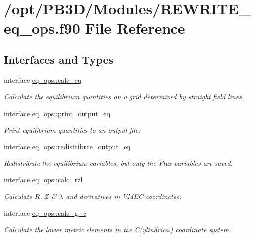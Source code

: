 \hypertarget{REWRITE__eq__ops_8f90}{}\section{/opt/\+P\+B3\+D/\+Modules/\+R\+E\+W\+R\+I\+T\+E\+\_\+eq\+\_\+ops.f90 File Reference}
\label{REWRITE__eq__ops_8f90}
\subsection*{Interfaces and Types}
\begin{DoxyCompactItemize}
\item 
interface \hyperlink{interfaceeq__ops_1_1calc__eq}{eq\+\_\+ops\+::calc\+\_\+eq}
\begin{DoxyCompactList}\small\item\em Calculate the equilibrium quantities on a grid determined by straight field lines. \end{DoxyCompactList}\item 
interface \hyperlink{interfaceeq__ops_1_1print__output__eq}{eq\+\_\+ops\+::print\+\_\+output\+\_\+eq}
\begin{DoxyCompactList}\small\item\em Print equilibrium quantities to an output file\+: \end{DoxyCompactList}\item 
interface \hyperlink{interfaceeq__ops_1_1redistribute__output__eq}{eq\+\_\+ops\+::redistribute\+\_\+output\+\_\+eq}
\begin{DoxyCompactList}\small\item\em Redistribute the equilibrium variables, but only the Flux variables are saved. \end{DoxyCompactList}\item 
interface \hyperlink{interfaceeq__ops_1_1calc__rzl}{eq\+\_\+ops\+::calc\+\_\+rzl}
\begin{DoxyCompactList}\small\item\em Calculate $R$, $Z$ \& $\lambda$ and derivatives in V\+M\+EC coordinates. \end{DoxyCompactList}\item 
interface \hyperlink{interfaceeq__ops_1_1calc__g__c}{eq\+\_\+ops\+::calc\+\_\+g\+\_\+c}
\begin{DoxyCompactList}\small\item\em Calculate the lower metric elements in the C(ylindrical) coordinate system. \end{DoxyCompactList}\item 

\end{DoxyCompactItemize}
